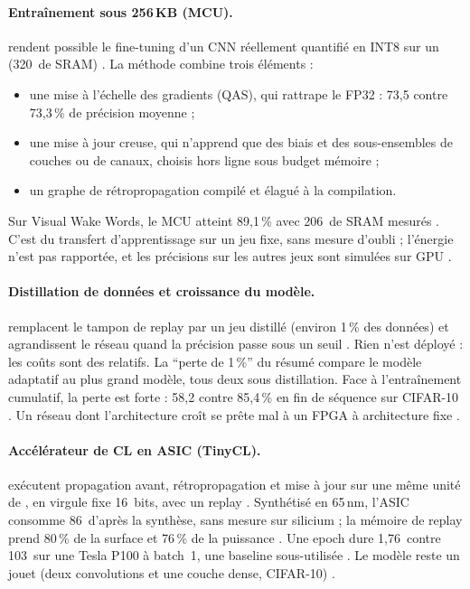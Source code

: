 \paragraph{Entraînement sous 256\,KB (MCU).}
\citet{arxiv-2206.15472-device-training-256kb-memory} rendent possible le fine-tuning d'un
CNN réellement quantifié en INT8 sur un  (320\, de SRAM) . La
méthode combine trois éléments :
\begin{itemize}
  \item une mise à l'échelle des gradients (QAS), qui rattrape le FP32 : 73,5 contre
    73,3\,\% de précision moyenne  ;
  \item une mise à jour creuse, qui n'apprend que des biais et des sous-ensembles de couches
    ou de canaux, choisis hors ligne sous budget mémoire  ;
  \item un graphe de rétropropagation compilé et élagué à la compilation.
\end{itemize}
Sur Visual Wake Words, le MCU atteint 89,1\,\% avec 206\, de SRAM mesurés .
C'est du transfert d'apprentissage sur un jeu fixe, sans mesure d'oubli ; l'énergie n'est
pas rapportée, et les précisions sur les autres jeux sont simulées sur GPU .

\paragraph{Distillation de données et croissance du modèle.}
\citet{arxiv-2409.07114-continual-incremental-learning-tinyml-device} remplacent le tampon de
replay par un jeu distillé (environ 1\,\% des données) et agrandissent le réseau quand la
précision passe sous un seuil . Rien n'est déployé : les coûts sont des
 relatifs. La \enquote{perte de 1\,\%} du résumé compare le modèle adaptatif au plus
grand modèle, tous deux sous distillation. Face à l'entraînement cumulatif, la perte est
forte : 58,2 contre 85,4\,\% en fin de séquence sur CIFAR-10 . Un réseau dont
l'architecture croît se prête mal à un FPGA à architecture fixe \deduit.

\paragraph{Accélérateur de CL en ASIC (TinyCL).}
\citet{arxiv-2402.09780-tinycl-efficient-hardware-architecture-continual}\pp{} exécutent
propagation avant, rétropropagation et mise à jour sur une même unité de , en virgule fixe
16~bits, avec un replay  . Synthétisé en 65\,nm, l'ASIC consomme
86\, d'après la synthèse, sans mesure sur silicium ; la mémoire de replay prend 80\,\% de
la surface et 76\,\% de la puissance . Une epoch dure 1,76\, contre
103\, sur une Tesla P100 à batch~1, une baseline sous-utilisée . Le modèle reste
un jouet (deux convolutions et une couche dense, CIFAR-10) .

